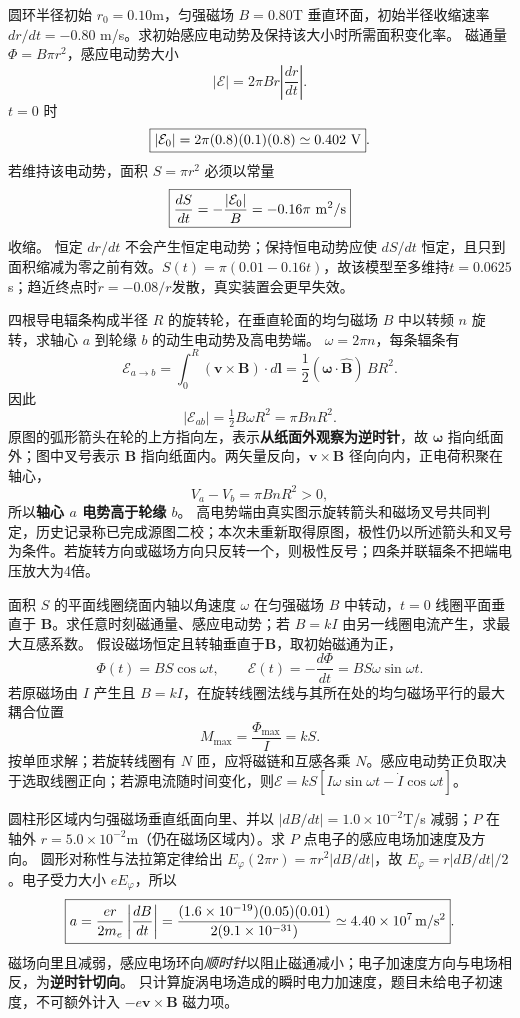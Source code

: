 \problemtext 圆环半径初始 $r_0=0.10$m，匀强磁场 $B=0.80$T 垂直环面，初始半径收缩速率 $dr/dt=-0.80$ m/s。求初始感应电动势及保持该大小时所需面积变化率。
\workings 磁通量 $\Phi=B\pi r^2$，感应电动势大小
\[|\mathcal E|=2\pi Br\left|\frac{dr}{dt}\right|.\]
$t=0$ 时
\[\boxed{|\mathcal E_0|=2\pi(0.8)(0.1)(0.8)\simeq0.402\ {\rm V}}.\]
若维持该电动势，面积 $S=\pi r^2$ 必须以常量
\[\boxed{\frac{dS}{dt}=-\frac{|\mathcal E_0|}{B}=-0.16\pi\ {\rm m^2/s}}\]
收缩。
\crosscheck 恒定 $dr/dt$ 不会产生恒定电动势；保持恒电动势应使 $dS/dt$ 恒定，且只到面积缩减为零之前有效。$S(t)=\pi(0.01-0.16t)$，故该模型至多维持$t=0.0625$ s；趋近终点时$\dot r=-0.08/r$发散，真实装置会更早失效。

\problemtext 四根导电辐条构成半径 $R$ 的旋转轮，在垂直轮面的均匀磁场 $B$ 中以转频 $n$ 旋转，求轴心 $a$ 到轮缘 $b$ 的动生电动势及高电势端。
\workings $\omega=2\pi n$，每条辐条有
\[\mathcal E_{a\to b}=\int_0^R(\bm v\times\bm B)\cdot d\bm l
=\frac12(\bm\omega\cdot\hat{\bm B})\,BR^2.\]
因此
\[\boxed{|\mathcal E_{ab}|=\tfrac12 B\omega R^2=\pi BnR^2}.\]
原图的弧形箭头在轮的上方指向左，表示\textbf{从纸面外观察为逆时针}，故 $\bm\omega$ 指向纸面外；图中叉号表示 $\bm B$ 指向纸面内。两矢量反向，$\bm v\times\bm B$ 径向向内，正电荷积聚在轴心，
\[
\boxed{V_a-V_b=\pi BnR^2>0},
\]
所以\textbf{轴心 $a$ 电势高于轮缘 $b$}。
\crosscheck 高电势端由真实图示旋转箭头和磁场叉号共同判定，历史记录称已完成源图二校；本次未重新取得原图，极性仍以所述箭头和叉号为条件。若旋转方向或磁场方向只反转一个，则极性反号；四条并联辐条不把端电压放大为4倍。

\problemtext 面积 $S$ 的平面线圈绕面内轴以角速度 $\omega$ 在匀强磁场 $B$ 中转动，$t=0$ 线圈平面垂直于 $\bm B$。求任意时刻磁通量、感应电动势；若 $B=kI$ 由另一线圈电流产生，求最大互感系数。
\workings 假设磁场恒定且转轴垂直于$\bm B$，取初始磁通为正，
\[\boxed{\Phi(t)=BS\cos\omega t},\qquad
\boxed{\mathcal E(t)=-\frac{d\Phi}{dt}=BS\omega\sin\omega t}.\]
若原磁场由 $I$ 产生且 $B=kI$，在旋转线圈法线与其所在处的均匀磁场平行的最大耦合位置
\[\boxed{M_{\max}=\frac{\Phi_{\max}}I=kS}.\]
\crosscheck 按单匝求解；若旋转线圈有 $N$ 匝，应将磁链和互感各乘 $N$。感应电动势正负取决于选取线圈正向；若源电流随时间变化，则$\mathcal E=kS[I\omega\sin\omega t-\dot I\cos\omega t]$。

\problemtext 圆柱形区域内匀强磁场垂直纸面向里、并以 $|dB/dt|=1.0\times10^{-2}$T/s 减弱；$P$ 在轴外 $r=5.0\times10^{-2}$m（仍在磁场区域内）。求 $P$ 点电子的感应电场加速度及方向。
\workings 圆形对称性与法拉第定律给出 $E_\varphi(2\pi r)=\pi r^2|dB/dt|$，故 $E_\varphi=r|dB/dt|/2$。电子受力大小 $eE_\varphi$，所以
\[
\boxed{a=\frac{er}{2m_e}\left|\frac{dB}{dt}\right|
=\frac{(1.6\times10^{-19})(0.05)(0.01)}{2(9.1\times10^{-31})}
\simeq4.40\times10^7\,{\rm m/s^2}}.
\]
磁场向里且减弱，感应电场环向\emph{顺时针}以阻止磁通减小；电子加速度方向与电场相反，为\textbf{逆时针切向}。
\crosscheck 只计算旋涡电场造成的瞬时电力加速度，题目未给电子初速度，不可额外计入 $-e\bm v\times\bm B$ 磁力项。


